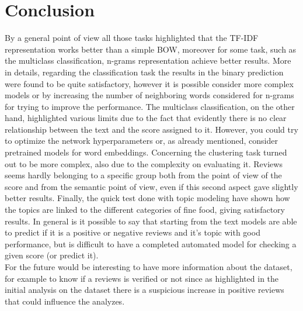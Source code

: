\documentclass[11pt]{article}
\begin{document}
\section{Conclusion}
By a general point of view all those tasks highlighted that the TF-IDF representation works better than a simple BOW, moreover for some task, such as the multiclass classification, n-grams representation achieve better results.
More in details, regarding the classification task the results in the binary prediction were found to be quite satisfactory, however it is possible consider more complex models or by increasing the number of neighboring words considered for n-grams for trying to improve the performance. The multiclass classification, on the other hand, highlighted various limits due to the fact that evidently there is no clear relationship between the text and the score assigned to it. However, you could try to optimize the network hyperparameters or, as already mentioned, consider pretrained models for word embeddings.
Concerning the clustering task turned out to be more complex, also due to the complexity on evaluating it. Reviews seems hardly belonging to a specific group both from the point of view of the score and from the semantic point of view, even if this second aspect gave slightly better results. Finally, the quick test done with topic modeling have shown how the topics are linked to the different categories of fine food, giving satisfactory results. 
In general is it possible to say that starting from the text models are able to predict if it is a positive or negative reviews and it's topic with good performance, but is difficult to have a completed automated model for checking a given score (or predict it). \\
For the future would be interesting to have more information about the dataset, for example to know if a reviews is verified or not since as highlighted in the initial analysis on the dataset there is a suspicious increase in positive reviews that could influence the analyzes.



\newpage

\nocite{*}

\end{document}
